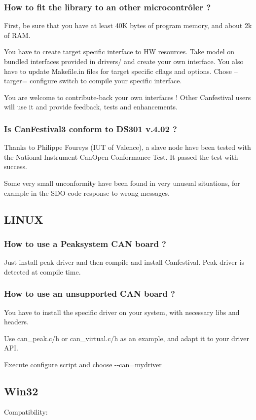 \documentclass[a4paper,12pt]{book}
\begin{document}
\subsubsection{How to fit the library to an other microcontr\^oler ?}
First, be sure that you have at least 40K bytes of program memory, and
about 2k of RAM. 

You have to create target specific interface to HW resources. Take model
on bundled interfaces provided in drivers/ and create your own
interface. You also have to update Makefile.in files for target
specific cflags and options. Chose {--}targer= configure switch to
compile your specific interface.

You are welcome to contribute{}-back your own interfaces ! Other
Canfestival users will use it and provide feedback, tests and
enhancements.

\subsubsection{Is CanFestival3 conform to DS301 v.4.02 ?}
Thanks to Philippe Foureys (IUT of Valence), a slave node have been
tested with the National Instrument CanOpen Conformance Test. It passed
the test with success.

Some very small unconformity have been found in very unusual situations,
for example in the SDO code response to wrong messages.

\subsection{LINUX}
\subsubsection{How to use a Peaksystem CAN board ?}
Just install peak driver and then compile and install Canfestival. Peak
driver is detected at compile time.

\subsubsection{How to use an unsupported CAN board ?}
You have to install the specific driver on your system, with necessary
libs and headers. 

Use can\_peak.c/h or can\_virtual.c/h as an example, and adapt it to
your driver API.

Execute configure script and choose {}-{}-can=mydriver

\subsection{Win32}
Compatibility:
\end{document}
